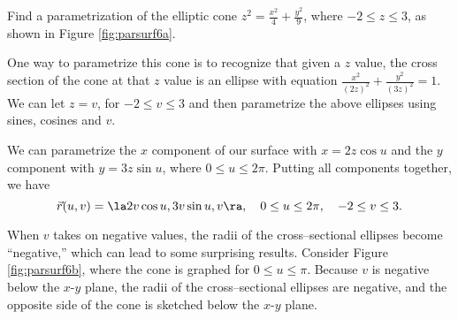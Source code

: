 {Find a parametrization of the elliptic cone $z^2 = \frac{x^2}{4}+\frac{y^2}{9}$, where $-2\leq z\leq 3$, as shown in Figure \ref{fig:parsurf6a}.
}
{One way to parametrize this cone is to recognize that given a $z$ value, the cross section of the cone at that $z$ value is an ellipse with equation $\frac{x^2}{(2z)^2} + \frac{y^2}{(3z)^2}=1$. We can let $z=v$, for $-2\leq v\leq 3$ and then parametrize the above ellipses using sines, cosines and $v$.

We can parametrize the $x$ component of our surface with $x=2z\cos u$ and the $y$ component with $y=3z\sin u$, where $0\leq u\leq 2\pi$. Putting all components together, we have
\[
\vec r(u,v) = \la 2v\cos u, 3v\sin u, v\ra,\quad 0\leq u\leq 2\pi,\quad -2\leq v\leq 3.
\]



When $v$ takes on negative values, the radii of the cross--sectional ellipses become ``negative,'' which can lead to some surprising results. Consider Figure \ref{fig:parsurf6b}, where the cone is graphed for $0\leq u\leq \pi$. Because $v$ is negative below the $x$-$y$ plane, the radii of the cross--sectional ellipses are negative, and the opposite side of the cone is sketched below the $x$-$y$ plane.
}\\

